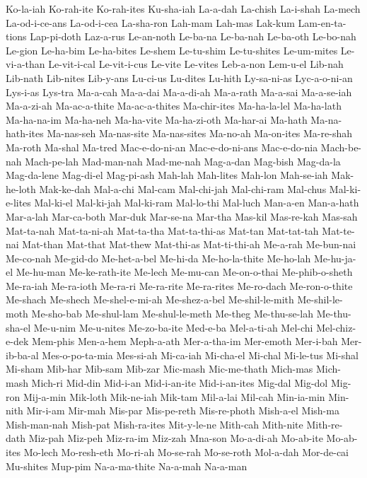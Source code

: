 {  Ko-la-iah Ko-rah-ite Ko-rah-ites Ku-sha-iah La-a-dah La-chish
  La-i-shah La-mech La-od-i-ce-ans La-od-i-cea La-sha-ron Lah-mam
  Lah-mas Lak-kum Lam-en-ta-tions Lap-pi-doth Laz-a-rus Le-an-noth
  Le-ba-na Le-ba-nah Le-ba-oth Le-bo-nah Le-gion Le-ha-bim
  Le-ha-bites Le-shem Le-tu-shim Le-tu-shites Le-um-mites Le-vi-a-than
  Le-vit-i-cal Le-vit-i-cus Le-vite Le-vites Leb-a-non Lem-u-el
  Lib-nah Lib-nath Lib-nites Lib-y-ans Lu-ci-us Lu-dites
  Lu-hith Ly-sa-ni-as Lyc-a-o-ni-an Lys-i-as Lys-tra Ma-a-cah
  Ma-a-dai Ma-a-di-ah Ma-a-rath Ma-a-sai Ma-a-se-iah Ma-a-zi-ah
  Ma-ac-a-thite Ma-ac-a-thites Ma-chir-ites Ma-ha-la-lel Ma-ha-lath Ma-ha-na-im
  Ma-ha-neh Ma-ha-vite Ma-ha-zi-oth Ma-har-ai Ma-hath Ma-na-hath-ites
  Ma-nas-seh Ma-nas-site Ma-nas-sites Ma-no-ah Ma-on-ites Ma-re-shah
  Ma-roth Ma-shal Ma-tred Mac-e-do-ni-an Mac-e-do-ni-ans Mac-e-do-nia
  Mach-be-nah Mach-pe-lah Mad-man-nah Mad-me-nah Mag-a-dan Mag-bish
  Mag-da-la Mag-da-lene Mag-di-el Mag-pi-ash Mah-lah Mah-lites
  Mah-lon Mah-se-iah Mak-he-loth Mak-ke-dah Mal-a-chi Mal-cam
  Mal-chi-jah Mal-chi-ram Mal-chus Mal-ki-e-lites Mal-ki-el Mal-ki-jah
  Mal-ki-ram Mal-lo-thi Mal-luch Man-a-en Man-a-hath Mar-a-lah
  Mar-ca-both Mar-duk Mar-se-na Mar-tha Mas-kil Mas-re-kah
  Mas-sah Mat-ta-nah Mat-ta-ni-ah Mat-ta-tha Mat-ta-thi-as Mat-tan
  Mat-tat-tah Mat-te-nai Mat-than Mat-that Mat-thew Mat-thi-as
  Mat-ti-thi-ah Me-a-rah Me-bun-nai Me-co-nah Me-gid-do Me-het-a-bel
  Me-hi-da Me-ho-la-thite Me-ho-lah Me-hu-ja-el Me-hu-man Me-ke-rath-ite
  Me-lech Me-mu-can Me-on-o-thai Me-phib-o-sheth Me-ra-iah Me-ra-ioth
  Me-ra-ri Me-ra-rite Me-ra-rites Me-ro-dach Me-ron-o-thite Me-shach
  Me-shech Me-shel-e-mi-ah Me-shez-a-bel Me-shil-le-mith Me-shil-le-moth Me-sho-bab
  Me-shul-lam Me-shul-le-meth Me-theg Me-thu-se-lah Me-thu-sha-el Me-u-nim
  Me-u-nites Me-zo-ba-ite Med-e-ba Mel-a-ti-ah Mel-chi Mel-chiz-e-dek
  Mem-phis Men-a-hem Meph-a-ath Mer-a-tha-im Mer-emoth Mer-i-bah
  Mer-ib-ba-al Mes-o-po-ta-mia Mes-si-ah Mi-ca-iah Mi-cha-el Mi-chal
  Mi-le-tus Mi-shal Mi-sham Mib-har Mib-sam Mib-zar
  Mic-mash Mic-me-thath Mich-mas Mich-mash Mich-ri Mid-din
  Mid-i-an Mid-i-an-ite Mid-i-an-ites Mig-dal Mig-dol Mig-ron
  Mij-a-min Mik-loth Mik-ne-iah Mik-tam Mil-a-lai Mil-cah
  Min-ia-min Min-nith Mir-i-am Mir-mah Mis-par Mis-pe-reth
  Mis-re-photh Mish-a-el Mish-ma Mish-man-nah Mish-pat Mish-ra-ites
  Mit-y-le-ne Mith-cah Mith-nite Mith-re-dath Miz-pah Miz-peh
  Miz-ra-im Miz-zah Mna-son Mo-a-di-ah Mo-ab-ite Mo-ab-ites
  Mo-lech Mo-resh-eth Mo-ri-ah Mo-se-rah Mo-se-roth Mol-a-dah
  Mor-de-cai Mu-shites Mup-pim Na-a-ma-thite Na-a-mah Na-a-man
}
